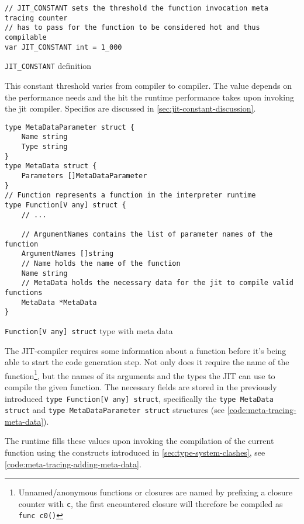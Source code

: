 \begin{listing}[H]
    \begin{verbatim}
// JIT_CONSTANT sets the threshold the function invocation meta tracing counter
// has to pass for the function to be considered hot and thus compilable
var JIT_CONSTANT int = 1_000
    \end{verbatim}
    \caption{\texttt{JIT\_CONSTANT} definition}
    \label{code:jit-constant}
\end{listing}

This constant threshold varies from compiler to compiler. The value depends on
the performance needs and the hit the runtime performance takes upon
invoking the jit compiler. Specifics are discussed in \autoref{sec:jit-constant-discussion}.

\begin{listing}[H]
    \begin{verbatim}
type MetaDataParameter struct {
	Name string
	Type string
}
type MetaData struct {
	Parameters []MetaDataParameter
}
// Function represents a function in the interpreter runtime
type Function[V any] struct {
    // ...

    // ArgumentNames contains the list of parameter names of the function
    ArgumentNames []string
    // Name holds the name of the function
    Name string
    // MetaData holds the necessary data for the jit to compile valid functions
    MetaData *MetaData
}
    \end{verbatim}
    \caption{\texttt{Function[V any] struct} type with meta data}
    \label{code:meta-tracing-meta-data}
\end{listing}

The JIT-compiler requires some information about a function before it's being
able to start the code generation step. Not only does it require the name of
the function\footnote{Unnamed/anonymous functions or closures are named by
prefixing a closure counter with \texttt{c}, the first encountered closure
will therefore be compiled as \texttt{func c0()}}, but the names of its
arguments and the types the JIT can use to compile the given function. The
necessary fields are stored in the previously introduced \texttt{type Function[V any] struct},
specifically the \texttt{type MetaData struct}
and \texttt{type MetaDataParameter struct} structures (see
\autoref{code:meta-tracing-meta-data}).

The runtime fills these values upon invoking the compilation of the current
function using the constructs introduced in
\autoref{sec:type-system-clashes}, see
\autoref{code:meta-tracing-adding-meta-data}. 

